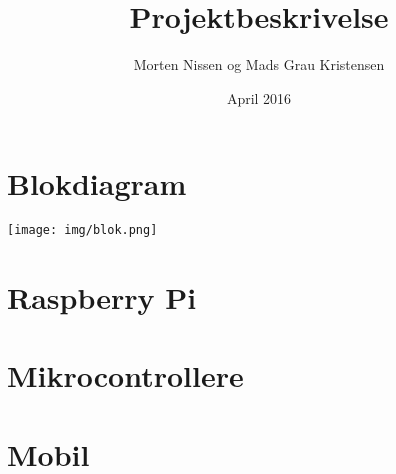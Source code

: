 \documentclass{article}
\title{Projektbeskrivelse}
\author{Morten Nissen og Mads Grau Kristensen}
\date{April 2016}
\begin{document}
\maketitle

\section{Blokdiagram}
\texttt{[image: img/blok.png]}

\section{Raspberry Pi}


\section{Mikrocontrollere}


\section{Mobil}

\end{document}
